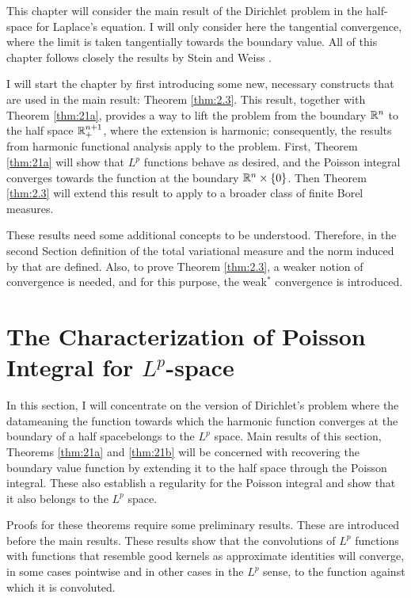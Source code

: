 This chapter will consider the main result of the Dirichlet problem in the half-space for Laplace's equation. I will only consider here the tangential convergence, where the limit is taken tangentially towards the boundary value. All of this chapter follows closely the results by Stein and Weiss \cite{stein_weiss}.

I will start the chapter by first introducing some new, necessary constructs that are used in the main result: Theorem \ref{thm:2.3}. This result, together with Theorem \ref{thm:21a}, provides a way to lift the problem from the boundary $\mathbb R^n$ to the half space $\mathbb R^{n+1}_+$, where the extension is harmonic; consequently, the results from harmonic functional analysis apply to the problem. First, Theorem \ref{thm:21a} will show that $L^p$ functions behave as desired, and the Poisson integral converges towards the function at the boundary $\mathbb R^n\times\{0\}$. Then Theorem \ref{thm:2.3} will extend this result to apply to a broader class of finite Borel measures.

These results need some additional concepts to be understood. Therefore, in the second Section definition of the total variational measure and the norm induced by that are defined. Also, to prove Theorem \ref{thm:2.3}, a weaker notion of convergence is needed, and for this purpose, the weak$^*$ convergence is introduced.

\section{The Characterization of Poisson Integral for $L^p$-space}\label{sec:LP}

In this section, I will concentrate on the version of Dirichlet's problem where the data\textemdash meaning the function towards which the harmonic function converges at the boundary of a half space\textemdash belongs to the $L^p$ space. Main results of this section, Theorems \ref{thm:21a} and \ref{thm:21b} will be concerned with recovering the boundary value function by extending it to the half space through the Poisson integral. These also establish a regularity for the Poisson integral and show that it also belongs to the $L^p$ space.

Proofs for these theorems require some preliminary results. These are introduced before the main results. These results show that the convolutions of $L^p$ functions with functions that resemble good kernels as approximate identities will converge, in some cases pointwise and in other cases in the $L^p$ sense, to the function against which it is convoluted.

